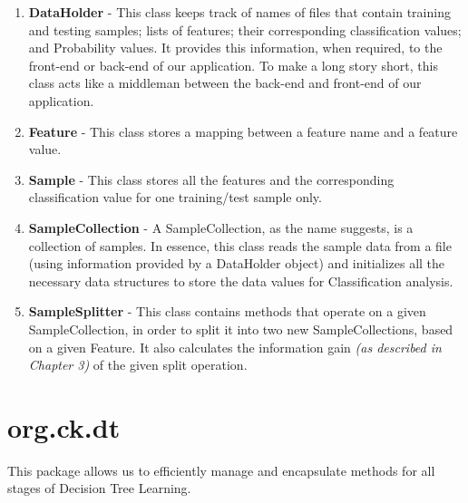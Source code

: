 \documentclass[12pt]{report}
\begin{document}
\begin{enumerate}
\item{\textbf{DataHolder}} - This class keeps track of names of files that contain training and testing samples; lists of features; their corresponding classification values; and Probability values. It provides this information, when required, to the front-end or back-end of our application. To make a long story short, this class acts like a middleman between the back-end and front-end of our application.
\item{\textbf{Feature}} - This class stores a mapping between a feature name and a feature value.

\item{\textbf{Sample}} - This class stores all the features and the corresponding classification value for one training/test sample only.  

\item{\textbf{SampleCollection}} - A SampleCollection, as the name suggests, is a collection of samples. In essence, this class reads the sample data from a file (using information provided by a DataHolder object) and initializes all the necessary data structures to store the data values for Classification analysis.

\item{\textbf{SampleSplitter}} - This class contains methods that operate on a given SampleCollection, in order to split it into two new SampleCollections, based on a given Feature. It also calculates the information gain \textit{(as described in Chapter 3)} of the given split operation.


\end{enumerate}



\section{org.ck.dt}

This package allows us to efficiently manage and encapsulate methods for all stages of Decision Tree Learning.
\end{document}
